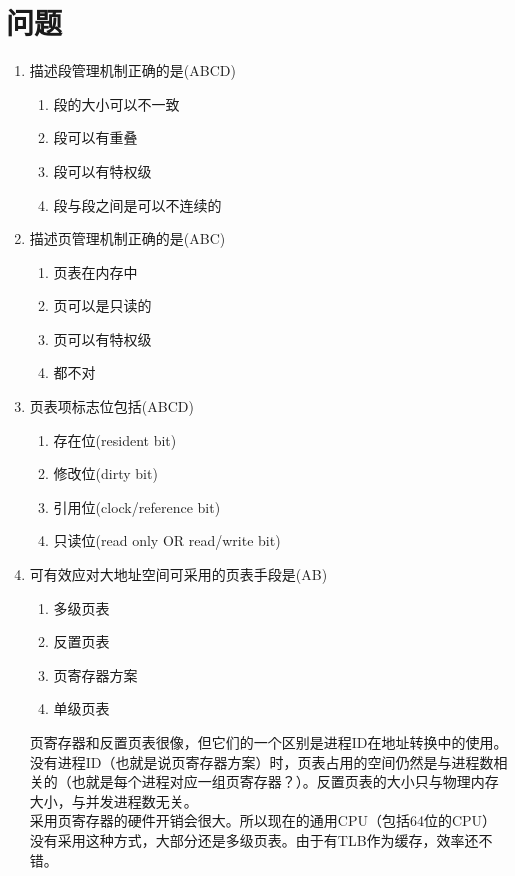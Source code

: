 \section{问题}
\begin{enumerate}
\item 描述段管理机制正确的是(ABCD)
\begin{enumerate}[A]
	\item 段的大小可以不一致
	\item 段可以有重叠
	\item 段可以有特权级
	\item 段与段之间是可以不连续的
\end{enumerate}

\item 描述页管理机制正确的是(ABC)
\begin{enumerate}[A]
	\item 页表在内存中
	\item 页可以是只读的
	\item 页可以有特权级
	\item 都不对
\end{enumerate}

\item 页表项标志位包括(ABCD)
\begin{enumerate}[A]
	\item 存在位(resident bit)
	\item 修改位(dirty bit)
	\item 引用位(clock/reference bit)
	\item 只读位(read only OR read/write bit)
\end{enumerate}

\item 可有效应对大地址空间可采用的页表手段是(AB)
\begin{enumerate}[A]
	\item 多级页表
	\item 反置页表
	\item 页寄存器方案
	\item 单级页表
\end{enumerate}
页寄存器和反置页表很像，但它们的一个区别是进程ID在地址转换中的使用。没有进程ID（也就是说页寄存器方案）时，页表占用的空间仍然是与进程数相关的（也就是每个进程对应一组页寄存器？）。反置页表的大小只与物理内存大小，与并发进程数无关。\\
采用页寄存器的硬件开销会很大。所以现在的通用CPU（包括64位的CPU）没有采用这种方式，大部分还是多级页表。由于有TLB作为缓存，效率还不错。

\end{enumerate}